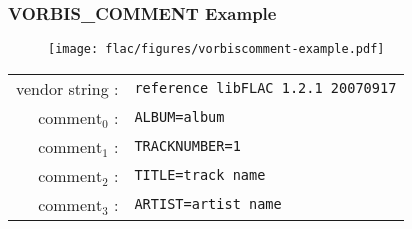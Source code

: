 \clearpage

\subsubsection{VORBIS\_COMMENT Example}
\begin{figure}[h]
  \texttt{[image: flac/figures/vorbiscomment-example.pdf]}
\end{figure}
\begin{table}[h]
\begin{tabular}{rl}
  vendor string : & \texttt{reference libFLAC 1.2.1 20070917} \\
  $\text{comment}_0$ : & \texttt{ALBUM=album} \\
  $\text{comment}_1$ : & \texttt{TRACKNUMBER=1} \\
  $\text{comment}_2$ : & \texttt{TITLE=track name} \\
  $\text{comment}_3$ : & \texttt{ARTIST=artist name} \\
\end{tabular}
\end{table}

\clearpage




